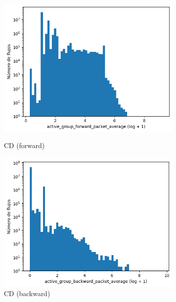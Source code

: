 \begin{figure}[H]
    \centering
    \begin{subfigure}[b]{0.26\textwidth}
        \centering
        \includegraphics[width=\textwidth]{media/packet_pincer_cicddos/active_group_forward_packet_average_log_x_log_y.png}
        \caption{CD (forward)}
        \includegraphics[width=\textwidth]{media/packet_pincer_cicddos/active_group_backward_packet_average_log_x_log_y.png}
        \caption{CD (backward)}
    \end{subfigure}
    \hfill
    \begin{subfigure}[b]{0.26\textwidth}
        \centering

\end{subfigure}
\end{figure}
